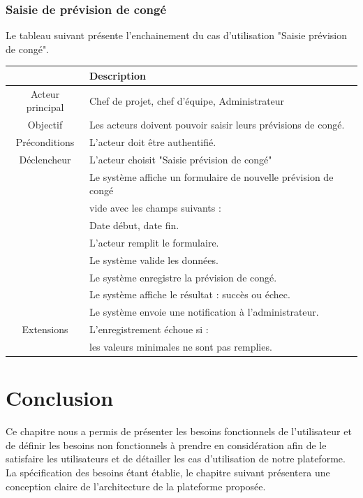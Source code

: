 \subsubsection{	Saisie de prévision de congé	}
\par Le tableau suivant présente l’enchainement du cas d’utilisation "Saisie prévision de congé".
\begin{center}
\begin{tabular}{|c|l|}
\hline 
&\textbf { Description }\\\hline 
    Acteur principal & Chef de projet, chef d’équipe, Administrateur \\\hline 
    Objectif&Les acteurs doivent pouvoir saisir leurs prévisions de congé.\\\hline
    Préconditions&L’acteur doit être authentifié.  \\\hline 
    Déclencheur&L’acteur choisit "Saisie prévision de congé"\\\hline
    &Le système affiche un formulaire de nouvelle prévision de congé\\
    &vide avec les champs suivants :    \\
    &Date début, date fin.   \\
   &L’acteur remplit le formulaire.  \\
    &Le système valide les données. \\&Le système enregistre la prévision de congé. \\&Le système affiche le résultat : succès ou échec.  \\&Le système envoie une notification à l’administrateur.\\\hline
    Extensions&   L’enregistrement échoue si :\\&les valeurs minimales ne sont pas remplies.\\\hline
\end{tabular}
\label{desc_saisie_conge}
\end{center}


\section*{Conclusion}
\hspace{4mm} Ce chapitre nous a permis de présenter les besoins fonctionnels de l’utilisateur et de définir les besoins non fonctionnels à prendre en considération afin de le satisfaire les utilisateurs et de détailler les cas d’utilisation de notre plateforme. La spécification des besoins étant établie, le chapitre suivant présentera une conception claire de l’architecture de la
plateforme proposée.  